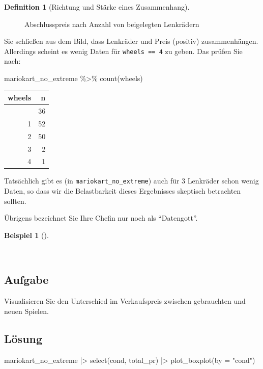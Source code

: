 \documentclass[
  a4paper,
  DIV=11]{scrreprt}
\newenvironment{Shaded}{\begin{snugshade}}{\end{snugshade}}
\newcommand{\AttributeTok}[1]{\textcolor[rgb]{0.40,0.45,0.13}{#1}}
\newcommand{\FunctionTok}[1]{\textcolor[rgb]{0.28,0.35,0.67}{#1}}
\newcommand{\NormalTok}[1]{\textcolor[rgb]{0.00,0.23,0.31}{#1}}
\newcommand{\SpecialCharTok}[1]{\textcolor[rgb]{0.37,0.37,0.37}{#1}}
\newcommand{\StringTok}[1]{\textcolor[rgb]{0.13,0.47,0.30}{#1}}
\theoremstyle{definition}
\theoremstyle{definition}
\newtheorem{example}{Beispiel}[chapter]
\theoremstyle{definition}
\newtheorem{definition}{Definition}[chapter]
\theoremstyle{remark}
\begin{document}
\begin{definition}[Richtung und Stärke eines
Zusammenhang]
\begin{figure}
\caption{\label{fig-box-wheels1}Abschlusspreis nach Anzahl von
beigelegten Lenkrädern}

\end{figure}%

Sie schließen aus dem Bild, dass Lenkräder und Preis (positiv)
zusammenhängen. Allerdings scheint es wenig Daten für
\texttt{wheels\ ==\ 4} zu geben. Das prüfen Sie nach:

\begin{Shaded}
\begin{Highlighting}[]
\NormalTok{mariokart\_no\_extreme }\SpecialCharTok{\%\textgreater{}\%} 
  \FunctionTok{count}\NormalTok{(wheels)}
\end{Highlighting}
\end{Shaded}

\begin{longtable}[]{@{}rr@{}}
\toprule\noalign{}
wheels & n \\
\midrule\noalign{}
\endhead
\bottomrule\noalign{}
\endlastfoot
0 & 36 \\
1 & 52 \\
2 & 50 \\
3 & 2 \\
4 & 1 \\
\end{longtable}

Tatsächlich gibt es (in \texttt{mariokart\_no\_extreme}) auch für 3
Lenkräder schon wenig Daten, so dass wir die Belastbarkeit dieses
Ergebnisses skeptisch betrachten sollten.

Übrigens bezeichnet Sie Ihre Chefin nur noch als ``Datengott''.

\begin{example}[]\protect\hypertarget{exm-diff-plot}{}\label{exm-diff-plot}

~

\subsection{Aufgabe}

Visualisieren Sie den Unterschied im Verkaufspreis zwischen gebrauchten
und neuen Spielen.

\subsection{Lösung}

\begin{Shaded}
\begin{Highlighting}[]
\NormalTok{mariokart\_no\_extreme }\SpecialCharTok{|\textgreater{}} 
  \FunctionTok{select}\NormalTok{(cond, total\_pr) }\SpecialCharTok{|\textgreater{}} 
  \FunctionTok{plot\_boxplot}\NormalTok{(}\AttributeTok{by =} \StringTok{"cond"}\NormalTok{)}
\end{Highlighting}
\end{Shaded}


\end{example}
\end{definition}
\end{document}

